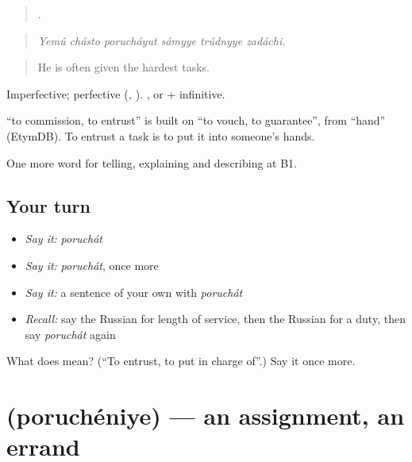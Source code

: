 \begin{quote}
     .
\end{quote}

\begin{quote}
\emph{Yemú chásto porucháyut sámyye trúdnyye zadáchi.}
\end{quote}

\begin{quote}
He is often given the hardest tasks.
\end{quote}

Imperfective; perfective \emph{} (\emph{, }). \emph{  }, or + infinitive.

\begin{cousinweb}
\textbf{} \textquotedblleft{}to commission, to entrust\textquotedblright{} is built on \emph{} \textquotedblleft{}to vouch, to guarantee\textquotedblright{}, from \emph{} \textquotedblleft{}hand\textquotedblright{} (EtymDB). To entrust a task is to put it into someone’s hands.
\end{cousinweb}

\begin{grammarlens}[title={What you've built}]
One more word for telling, explaining and describing at B1.
\end{grammarlens}

\subsection*{Your turn}
\begin{itemize}
\raggedright
  \item \emph{Say it:} \emph{poruchát}
  \item \emph{Say it:} \emph{poruchát}, once more
  \item \emph{Say it:} a sentence of your own with \emph{poruchát}
  \item \emph{Recall:} say the Russian for length of service, then the Russian for a duty, then say \emph{poruchát} again
\end{itemize}

\begin{tcolorbox}[breakable,colback=teal!4,colframe=teal!35!black,title={Before you move on}]
What does  mean? (\textquotedblleft{}To entrust, to put in charge of\textquotedblright{}.) Say it once more.
\end{tcolorbox}
\section[\texorpdfstring{\ru{поручение} (poruchéniye)}{поручение (poruchéniye)}]{ (poruchéniye) — an assignment, an errand}


